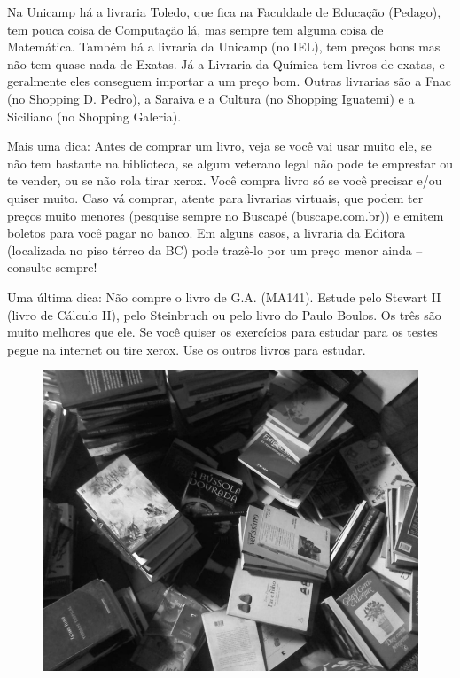 Na Unicamp há a livraria Toledo, que fica na Faculdade de Educação (Pedago), tem
pouca coisa de Computação lá, mas sempre tem alguma coisa de Matemática. Também
há a livraria da Unicamp (no IEL), tem preços bons mas não tem quase nada de
Exatas. Já a Livraria da Química tem livros de exatas, e geralmente eles
conseguem importar a um preço bom. Outras livrarias são a Fnac (no Shopping D.
Pedro), a Saraiva e a Cultura (no Shopping Iguatemi) e a Siciliano (no Shopping
Galeria).

Mais uma dica: Antes de comprar um livro, veja se você vai usar muito ele, se
não tem bastante na biblioteca, se algum veterano legal não pode te emprestar ou
te vender, ou se não rola tirar xerox. Você compra livro só se você precisar
e/ou quiser muito. Caso vá comprar, atente para livrarias virtuais, que podem
ter preços muito menores (pesquise sempre no Buscapé
(\url{buscape.com.br})) e emitem boletos para você pagar no banco.
Em alguns casos, a livraria da Editora (localizada no piso térreo da BC) pode
trazê-lo por um preço menor ainda -- consulte sempre!

Uma última dica: Não compre o livro de G.A. (MA141). Estude pelo Stewart II
(livro de Cálculo II), pelo Steinbruch ou pelo livro do Paulo
Boulos. Os três são muito melhores que ele. Se você quiser os exercícios para
estudar para os testes pegue na internet ou tire xerox. Use os outros livros
para estudar.

\begin{figure}[h!]
    \centering
    \includegraphics[scale=0.29, keepaspectratio=true]{./img/imgs/9-outras_necessidades/-068.jpg}
\end{figure}



